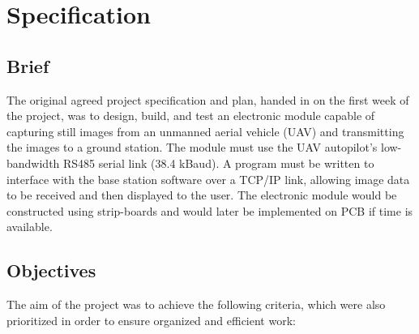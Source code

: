\chapter{Specification}
\label{chap:specification}
\section{Brief}
The original agreed project specification and plan, handed in on the first week of the project, was to design, build, and test an electronic module capable of capturing still images from an unmanned aerial vehicle (UAV) and transmitting the images to a ground station. The module must use the UAV autopilot’s low-bandwidth RS485 serial link (38.4 kBaud). A program must be written to interface with the base station software over a TCP/IP link, allowing image data to be received and then displayed to the user. The electronic module would be constructed using strip-boards and would later be implemented on PCB if time is available.


\section{Objectives} 
The aim of the project was to achieve the following criteria, which were also prioritized in order to ensure organized and efficient work: 



